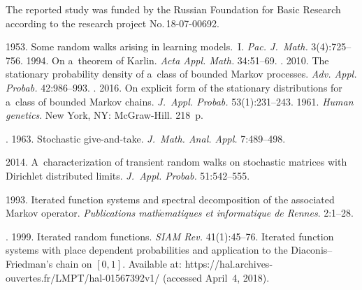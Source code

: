 



\Ack
\noindent
The reported study was funded by the Russian Foundation for
Basic Research according to the research 
project No.\,18-07-00692.




  \begin{multicols}{2}

\renewcommand{\bibname}{\protect\rmfamily References}

{\small\frenchspacing
 {%
 \begin{thebibliography}{99}
   1953. Some random walks arising in learning models.~I.
  \textit{Pac. J.~Math.} 3(4):725--756.
   1994. On a~theorem of Karlin. \textit{Acta Appl. Math.} 34:51--69.
  . 2010. The stationary probability density of a~class of 
bounded Markov processes. \textit{Adv. Appl. Probab.} 42:986--993.
  . 2016. On explicit form of the stationary distributions 
for a~class of bounded Markov chains. \textit{J.~Appl. Probab.} 53(1):231--243. 
   1961. \textit{Human genetics}. New York, NY: McGraw-Hill. 218~p.
  
  . 1963. Stochastic give-and-take. \textit{J.~Math. 
Anal. Appl.} 7:489--498.

   2014. A~characterization of transient random walks on stochastic 
matrices with Dirichlet distributed limits. \textit{J.~Appl. Probab.} 51:542--555.

   1993. Iterated function systems and spectral 
decomposition of the associated Markov operator. \textit{Publications 
math$\acute{\mbox{e}}$matiques et informatique de Rennes}. 2:1--28.

  . 1999. Iterated random functions. \textit{SIAM 
Rev.} 41(1):45--76.
   Iterated function systems with place 
dependent probabilities and application to the Diaconis--Friedman's chain on $[0,1]$. Available 
at: {\sf https://hal.archives-ouvertes.fr/LMPT/hal-01567392v1/} (accessed April~4, 2018).
  

\end{thebibliography}}}
\end{multicols}
